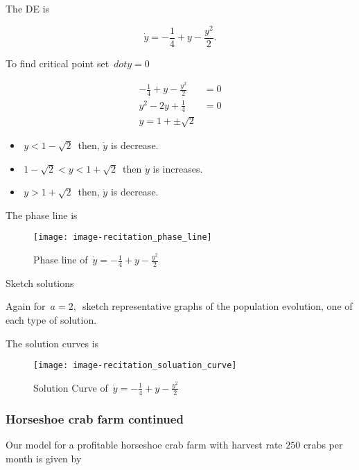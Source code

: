 The DE is

\begin{equation*}
  \dot y = -\frac{1}{4} + y - \frac{y^2}{2}.
\end{equation*}

To find critical point set $\, dot y = 0\,$

\begin{align*}
  -\frac{1}{4} + y - \frac{y^2}{2} &= 0 \\
  y^2 -2y + \frac{1}{4} &= 0 \\
  y = 1 + \pm \sqrt{2}
\end{align*}

\begin{itemize}
\item $\, y < 1 - \sqrt{2}\,$ then, $\dot y$ is decrease.
\item $\, 1 - \sqrt{2} < y < 1 + \sqrt{2}\, $ then $\dot y$ is increases.
\item $\, y > 1 + \sqrt{2}\,$ then, $\dot y$ is decrease.
\end{itemize}

\clearpage

The phase line is

\begin{figure}[ht!]
  \centering
  \texttt{[image: image-recitation\_phase\_line]}
  \caption{Phase line of $\, \dot y = -\frac{1}{4} + y - \frac{y^2}{2} $}
\end{figure}

\begin{problem}
  Sketch solutions
\end{problem}

Again for $\,a = 2,\,$ sketch representative graphs of the population evolution,
one of each type of solution.

The solution curves is

\begin{figure}[ht!]
  \centering
  \texttt{[image: image-recitation\_soluation\_curve]}
  \caption{Solution Curve of $\, \dot y = -\frac{1}{4} + y - \frac{y^2}{2} $}
\end{figure}

\clearpage

\subsubsection{Horseshoe crab farm continued}

Our model for a profitable horseshoe crab farm with
harvest rate $250$ crabs per month is given by

